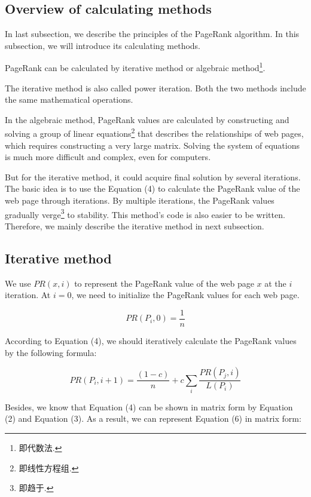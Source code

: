 \documentclass[lettersize,journal,12pt,conference]{IEEEtran}
\begin{document}
\subsection{Overview of calculating methods}

In last subsection, we describe the principles of the PageRank algorithm. In this subsection, we will introduce its calculating methods.

PageRank can be calculated by iterative method or algebraic method\footnote[1]{即代数法.}. 

The iterative method is also called power iteration. Both the two methods include the same mathematical operations. 

In the algebraic method, PageRank values are calculated by constructing and solving a group of linear equations\footnote[2]{即线性方程组.} that describes the relationships of web pages, which requires constructing a very large matrix. Solving the system of equations is much more difficult and complex, even for computers.

But for the iterative method, it could acquire final solution by several iterations. The basic idea is to use the Equation (4) to calculate the PageRank value of the web page through iterations. By multiple iterations, the PageRank values gradually verge\footnote[3]{即趋于.} to stability. This method's code is also easier to be written. Therefore, we mainly describe the iterative method in next subsection. 

\subsection{Iterative method}

We use $PR(x, i)$ to represent the PageRank value of the web page $x$ at the $i$ iteration. At $i = 0$, we need to initialize the PageRank values for each web page.

\begin{equation}
	\label{eq:5}
	PR(P_i, 0) = \frac{1}{n}
\end{equation}

According to Equation (4), we should iteratively calculate the PageRank values by the following formula:

\begin{equation}
	\label{eq:6}
	PR(P_i, i+1) = \frac{(1 - c)}{n} + c \sum_{i} \frac{PR(P_j, i)}{L(P_i)}
\end{equation}

Besides, we know that Equation (4) can be shown in matrix form by Equation (2) and Equation (3). As a result, we can represent Equation (6) in matrix form:
\end{document}
